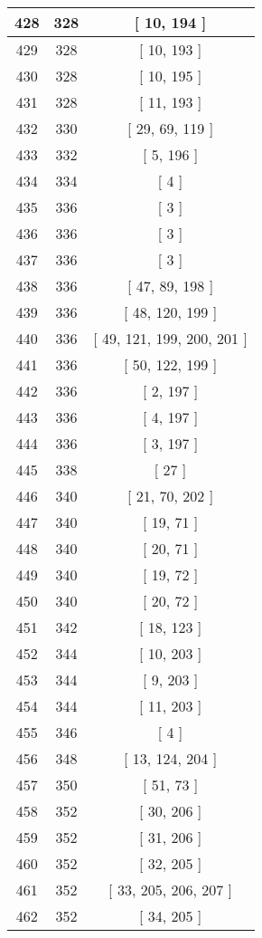 \begin{center}
\begin{longtable}[H]{|| c c c ||}
\hline
428 & 328 & [ 10, 194 ] \\ 
\hline
429 & 328 & [ 10, 193 ] \\ 
\hline
430 & 328 & [ 10, 195 ] \\ 
\hline
431 & 328 & [ 11, 193 ] \\ 
\hline
432 & 330 & [ 29, 69, 119 ] \\ 
\hline
433 & 332 & [ 5, 196 ] \\ 
\hline
434 & 334 & [ 4 ] \\ 
\hline
435 & 336 & [ 3 ] \\ 
\hline
436 & 336 & [ 3 ] \\ 
\hline
437 & 336 & [ 3 ] \\ 
\hline
438 & 336 & [ 47, 89, 198 ] \\ 
\hline
439 & 336 & [ 48, 120, 199 ] \\ 
\hline
440 & 336 & [ 49, 121, 199, 200, 201 ] \\ 
\hline
441 & 336 & [ 50, 122, 199 ] \\ 
\hline
442 & 336 & [ 2, 197 ] \\ 
\hline
443 & 336 & [ 4, 197 ] \\ 
\hline
444 & 336 & [ 3, 197 ] \\ 
\hline
445 & 338 & [ 27 ] \\ 
\hline
446 & 340 & [ 21, 70, 202 ] \\ 
\hline
447 & 340 & [ 19, 71 ] \\ 
\hline
448 & 340 & [ 20, 71 ] \\ 
\hline
449 & 340 & [ 19, 72 ] \\ 
\hline
450 & 340 & [ 20, 72 ] \\ 
\hline
451 & 342 & [ 18, 123 ] \\ 
\hline
452 & 344 & [ 10, 203 ] \\ 
\hline
453 & 344 & [ 9, 203 ] \\ 
\hline
454 & 344 & [ 11, 203 ] \\ 
\hline
455 & 346 & [ 4 ] \\ 
\hline
456 & 348 & [ 13, 124, 204 ] \\ 
\hline
457 & 350 & [ 51, 73 ] \\ 
\hline
458 & 352 & [ 30, 206 ] \\ 
\hline
459 & 352 & [ 31, 206 ] \\ 
\hline
460 & 352 & [ 32, 205 ] \\ 
\hline
461 & 352 & [ 33, 205, 206, 207 ] \\ 
\hline
462 & 352 & [ 34, 205 ] \\ 

\end{longtable}
\end{center}
